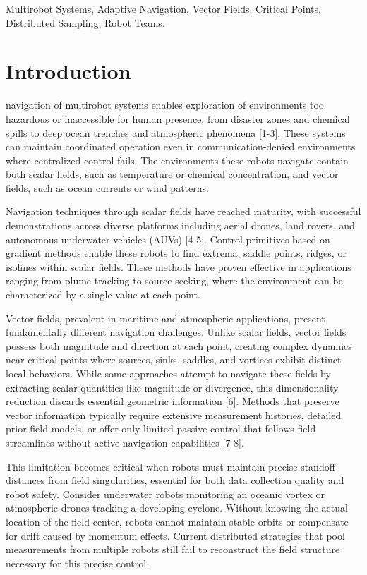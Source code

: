 \documentclass[lettersize,journal]{IEEEtran}
\begin{document}
\begin{IEEEkeywords}
Multirobot Systems, Adaptive Navigation, Vector Fields, Critical Points, Distributed Sampling, Robot Teams.
\end{IEEEkeywords}


\section{Introduction}
 navigation of multirobot systems enables exploration of environments too hazardous or inaccessible for human presence, from disaster zones and chemical spills to deep ocean trenches and atmospheric phenomena [1-3]. These systems can maintain coordinated operation even in communication-denied environments where centralized control fails. The environments these robots navigate contain both scalar fields, such as temperature or chemical concentration, and vector fields, such as ocean currents or wind patterns.

Navigation techniques through scalar fields have reached maturity, with successful demonstrations across diverse platforms including aerial drones, land rovers, and autonomous underwater vehicles (AUVs) [4-5]. Control primitives based on gradient methods enable these robots to find extrema, saddle points, ridges, or isolines within scalar fields. These methods have proven effective in applications ranging from plume tracking to source seeking, where the environment can be characterized by a single value at each point.

Vector fields, prevalent in maritime and atmospheric applications, present fundamentally different navigation challenges. Unlike scalar fields, vector fields possess both magnitude and direction at each point, creating complex dynamics near critical points where sources, sinks, saddles, and vortices exhibit distinct local behaviors. While some approaches attempt to navigate these fields by extracting scalar quantities like magnitude or divergence, this dimensionality reduction discards essential geometric information [6]. Methods that preserve vector information typically require extensive measurement histories, detailed prior field models, or offer only limited passive control that follows field streamlines without active navigation capabilities [7-8].

This limitation becomes critical when robots must maintain precise standoff distances from field singularities, essential for both data collection quality and robot safety. Consider underwater robots monitoring an oceanic vortex or atmospheric drones tracking a developing cyclone. Without knowing the actual location of the field center, robots cannot maintain stable orbits or compensate for drift caused by momentum effects. Current distributed strategies that pool measurements from multiple robots still fail to reconstruct the field structure necessary for this precise control.
\end{document}
